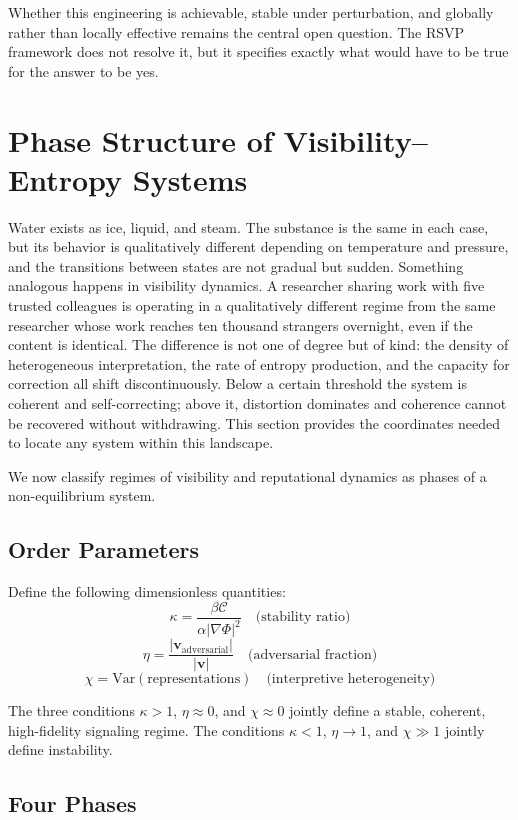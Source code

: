 \documentclass[12pt,a4paper]{article}
\begin{document}
Whether this engineering is achievable, stable under perturbation, and globally rather than locally effective remains the central open question. The RSVP framework does not resolve it, but it specifies exactly what would have to be true for the answer to be yes.

\section{Phase Structure of Visibility--Entropy Systems}

Water exists as ice, liquid, and steam. The substance is the same in each case, but its behavior is qualitatively different depending on temperature and pressure, and the transitions between states are not gradual but sudden. Something analogous happens in visibility dynamics. A researcher sharing work with five trusted colleagues is operating in a qualitatively different regime from the same researcher whose work reaches ten thousand strangers overnight, even if the content is identical. The difference is not one of degree but of kind: the density of heterogeneous interpretation, the rate of entropy production, and the capacity for correction all shift discontinuously. Below a certain threshold the system is coherent and self-correcting; above it, distortion dominates and coherence cannot be recovered without withdrawing. This section provides the coordinates needed to locate any system within this landscape.

We now classify regimes of visibility and reputational dynamics as phases of a non-equilibrium system.

\subsection{Order Parameters}

Define the following dimensionless quantities:
\[
\kappa = \frac{\beta \mathcal{C}}{\alpha |\nabla \Phi|^2}
\quad \text{(stability ratio)}
\]
\[
\eta = \frac{|\mathbf{v}_{\text{adversarial}}|}{|\mathbf{v}|}
\quad \text{(adversarial fraction)}
\]
\[
\chi = \mathrm{Var}(\text{representations})
\quad \text{(interpretive heterogeneity)}
\]

The three conditions $\kappa > 1$, $\eta \approx 0$, and $\chi \approx 0$ jointly define a stable, coherent, high-fidelity signaling regime. The conditions $\kappa < 1$, $\eta \rightarrow 1$, and $\chi \gg 1$ jointly define instability.

\subsection{Four Phases}
\end{document}

